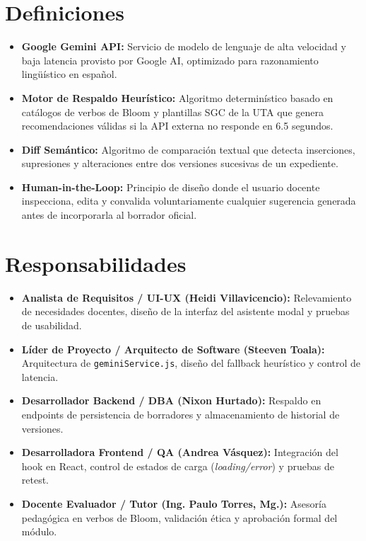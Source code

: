\documentclass[12pt,a4paper]{article}
\begin{document}
\section{Definiciones}
\begin{itemize}[leftmargin=1.5em, itemsep=2pt]
    \item \textbf{Google Gemini API:} Servicio de modelo de lenguaje de alta velocidad y baja latencia provisto por Google AI, optimizado para razonamiento lingüístico en español.
    \item \textbf{Motor de Respaldo Heurístico:} Algoritmo determinístico basado en catálogos de verbos de Bloom y plantillas SGC de la UTA que genera recomendaciones válidas si la API externa no responde en 6.5 segundos.
    \item \textbf{Diff Semántico:} Algoritmo de comparación textual que detecta inserciones, supresiones y alteraciones entre dos versiones sucesivas de un expediente.
    \item \textbf{Human-in-the-Loop:} Principio de diseño donde el usuario docente inspecciona, edita y convalida voluntariamente cualquier sugerencia generada antes de incorporarla al borrador oficial.
\end{itemize}

\section{Responsabilidades}
\begin{itemize}[leftmargin=1.5em, itemsep=2pt]
    \item \textbf{Analista de Requisitos / UI-UX (Heidi Villavicencio):} Relevamiento de necesidades docentes, diseño de la interfaz del asistente modal y pruebas de usabilidad.
    \item \textbf{Líder de Proyecto / Arquitecto de Software (Steeven Toala):} Arquitectura de \texttt{geminiService.js}, diseño del fallback heurístico y control de latencia.
    \item \textbf{Desarrollador Backend / DBA (Nixon Hurtado):} Respaldo en endpoints de persistencia de borradores y almacenamiento de historial de versiones.
    \item \textbf{Desarrolladora Frontend / QA (Andrea Vásquez):} Integración del hook en React, control de estados de carga (\textit{loading/error}) y pruebas de retest.
    \item \textbf{Docente Evaluador / Tutor (Ing. Paulo Torres, Mg.):} Asesoría pedagógica en verbos de Bloom, validación ética y aprobación formal del módulo.
\end{itemize}
\end{document}
